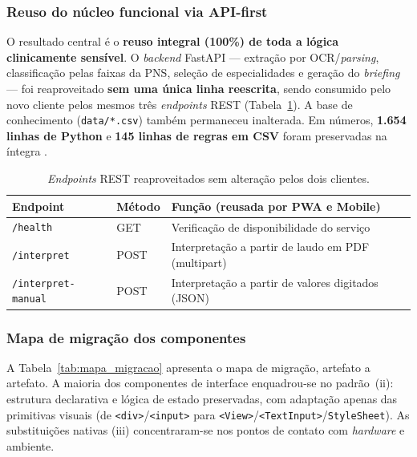 \subsubsection{Reuso do núcleo funcional via API-first}

O resultado central é o \textbf{reuso integral (100\%) de toda a lógica
clinicamente sensível}. O \emph{backend} FastAPI --- extração por OCR/\emph{parsing},
classificação pelas faixas da PNS, seleção de especialidades e geração do
\emph{briefing} --- foi reaproveitado \textbf{sem uma única linha reescrita}, sendo
consumido pelo novo cliente pelos mesmos três \emph{endpoints} REST
(Tabela~\ref{tab:endpoints}). A base de conhecimento (\texttt{data/*.csv}) também
permaneceu inalterada. Em números, \textbf{1.654 linhas de Python} e \textbf{145
linhas de regras em CSV} foram preservadas na íntegra \cite{rampinelli2026}.

\begin{table}[H]
\centering
\caption{\emph{Endpoints} REST reaproveitados sem alteração pelos dois clientes.}
\label{tab:endpoints}
\footnotesize
\begin{tabular}{|l|l|p{6.2cm}|}
\hline
\textbf{Endpoint} & \textbf{Método} & \textbf{Função (reusada por PWA e Mobile)} \\ \hline
\texttt{/health} & GET & Verificação de disponibilidade do serviço \\ \hline
\texttt{/interpret} & POST & Interpretação a partir de laudo em PDF (multipart) \\ \hline
\texttt{/interpret-manual} & POST & Interpretação a partir de valores digitados (JSON) \\ \hline
\end{tabular}
\end{table}

\subsubsection{Mapa de migração dos componentes}

A Tabela~\ref{tab:mapa_migracao} apresenta o mapa de migração, artefato a
artefato. A maioria dos componentes de interface enquadrou-se no padrão~(ii):
estrutura declarativa e lógica de estado preservadas, com adaptação apenas das
primitivas visuais (de \texttt{<div>}/\texttt{<input>} para
\texttt{<View>}/\texttt{<TextInput>}/\texttt{StyleSheet}). As substituições
nativas (iii) concentraram-se nos pontos de contato com \emph{hardware} e ambiente.

